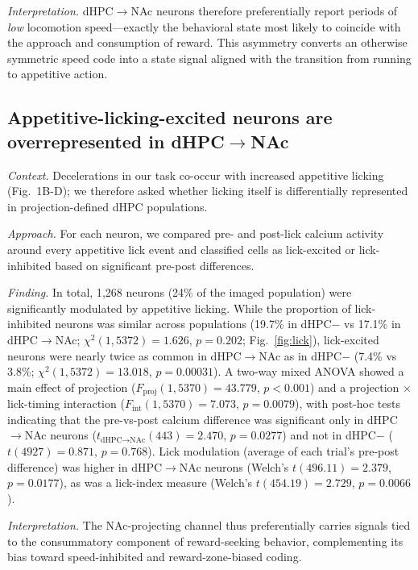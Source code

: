 \documentclass[11pt]{article}
\begin{document}
\textit{Interpretation.} dHPC$\rightarrow$NAc neurons therefore preferentially report periods of \emph{low} locomotion speed---exactly the behavioral state most likely to coincide with the approach and consumption of reward. This asymmetry converts an otherwise symmetric speed code into a state signal aligned with the transition from running to appetitive action.

\subsection{Appetitive-licking-excited neurons are overrepresented in dHPC$\rightarrow$NAc}

\textit{Context.} Decelerations in our task co-occur with increased appetitive licking (Fig.~1B-D); we therefore asked whether licking itself is differentially represented in projection-defined dHPC populations.

\textit{Approach.} For each neuron, we compared pre- and post-lick calcium activity around every appetitive lick event and classified cells as lick-excited or lick-inhibited based on significant pre-post differences.

\textit{Finding.} In total, 1{,}268 neurons (24\% of the imaged population) were significantly modulated by appetitive licking. While the proportion of lick-inhibited neurons was similar across populations (19.7\% in dHPC$-$ vs 17.1\% in dHPC$\rightarrow$NAc; $\chi^2(1,5372)=1.626$, $p=0.202$; Fig.~\ref{fig:lick}), lick-excited neurons were nearly twice as common in dHPC$\rightarrow$NAc as in dHPC$-$ (7.4\% vs 3.8\%; $\chi^2(1,5372)=13.018$, $p=0.00031$). A two-way mixed ANOVA showed a main effect of projection ($F_{\text{proj}}(1,5370)=43.779$, $p<0.001$) and a projection $\times$ lick-timing interaction ($F_{\text{int}}(1,5370)=7.073$, $p=0.0079$), with post-hoc tests indicating that the pre-vs-post calcium difference was significant only in dHPC$\rightarrow$NAc neurons ($t_{\text{dHPC}\rightarrow\text{NAc}}(443)=2.470$, $p=0.0277$) and not in dHPC$-$ ($t(4927)=0.871$, $p=0.768$). Lick modulation (average of each trial's pre-post difference) was higher in dHPC$\rightarrow$NAc neurons (Welch's $t(496.11)=2.379$, $p=0.0177$), as was a lick-index measure (Welch's $t(454.19)=2.729$, $p=0.0066$).

\textit{Interpretation.} The NAc-projecting channel thus preferentially carries signals tied to the consummatory component of reward-seeking behavior, complementing its bias toward speed-inhibited and reward-zone-biased coding.
\end{document}
